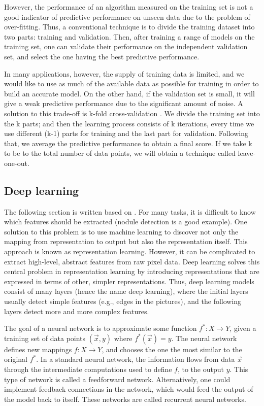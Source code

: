 \documentclass[12pt]{article}
\begin{document}
However, the performance of an algorithm measured on the training set is not a good indicator of predictive performance on unseen data due to the problem of over-fitting. Thus, a conventional technique is to divide the training dataset into two parts: training and validation. Then, after training a range of models on the training set, one can validate their performance on the independent validation set, and select the one having the best predictive performance. 

In many applications, however, the supply of training data is limited, and we would like to use as much of the available data as possible for training in order to build an accurate model. On the other hand, if the validation set is small, it will give a weak predictive performance due to the significant amount of noise. A solution to this trade-off is k-fold cross-validation \citep{bishop2006pattern}. We divide the training set into the k parts; and then the learning process consists of k iterations, every time we use different (k-1) parts for training and the last part for validation. Following that, we average the predictive performance to obtain a final score.  If we take k to be to the total number of data points, we will obtain a technique called leave-one-out. 


\subsection{Deep learning} 
The following section is written based on \citep{goodfellow2016deep}. For many tasks, it is difficult to know which features should be extracted (nodule detection is a good example). One solution to this problem is to use machine learning to discover not only the mapping from representation to output but also the representation itself. This approach is known as representation learning. However, it can be complicated to extract high-level, abstract features from raw pixel data. Deep learning solves this central problem in representation learning by introducing representations that are expressed in terms of other, simpler representations. Thus, deep learning models consist of many layers (hence the name deep learning), where the initial layers usually detect simple features (e.g., edges in the pictures), and the following layers detect more and more complex features. 

The goal of a neural network is to approximate some function $f^{*}: X \rightarrow Y$, given a training set of data points $(\vec{x}, y)$ where $f^*(\vec{x})=y$. The neural network defines new mappings $f: X \rightarrow Y$, and chooses the one the most similar to the original $f^*$. In a standard neural network, the information flows from data $\vec{x}$ through the intermediate computations used to define $f$, to the output $y$. This type of network is called a feedforward network. Alternatively, one could implement feedback connections in the network, which would feed the output of the model back to itself. These networks are called recurrent neural networks.
\end{document}
